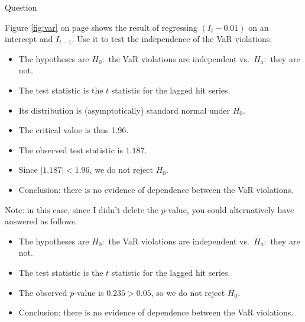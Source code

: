 \documentclass[12pt, a4paper]{article}
\begin{document}
\begin{exam}{Question \thequestion}
\begin{problem*}[\auto]
\begin{parts}
\item{}  Figure \ref{fig:var} on page \pageref{fig:var} shows the result of regressing $(I_t-0.01)$ on an intercept and $I_{t-1}$. Use it to test the independence of the VaR violations.
\begin{solution}[10cm]
\begin{itemize}
\item The hypotheses are $H_0:$ the VaR violations are independent vs.\ $H_a:$ they are not.
\item The test statistic is the $t$ statistic for the lagged hit series.
\item Its distribution is (asymptotically) standard normal under $H_0$.
\item The critical value is thus 1.96.
\item The observed test statistic is $1.187$.
\item Since $|1.187| < 1.96$, we do not reject $H_0$.
\item Conclusion: there is no evidence of dependence between the VaR violations.
\end{itemize}
Note: in this case, since I didn't delete the $p$-value, you could alternatively have answered as follows.
\begin{itemize}
\item The hypotheses are $H_0:$ the VaR violations are independent vs.\ $H_a:$ they are not.
\item The test statistic is the $t$ statistic for the lagged hit series.
\item The observed $p$-value is $0.235>0.05$, so we do not reject $H_0$.
\item Conclusion: there is no evidence of dependence between the VaR violations.
\end{itemize}
\end{solution}

\end{parts}
\end{problem*}
\end{exam}
\end{document}
